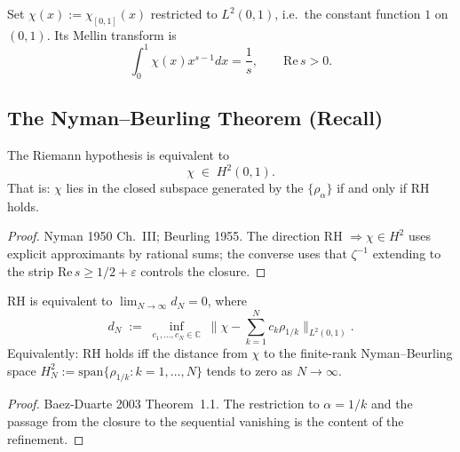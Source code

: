 \begin{definition}
\label{v4-arith:w7-b:def:chi}
Set \(\chi(x):=\chi_{[0,1]}(x)\) restricted to
\(L^{2}(0,1)\), i.e.\ the constant function \(1\) on \((0,1)\). Its Mellin
transform is
\begin{equation}
\label{v4-arith:w7-b:eq:mellin-chi}
\int_{0}^{1}\chi(x)x^{s-1}dx=\frac{1}{s},\qquad\mathrm{Re}\,s>0.
\end{equation}
\end{definition}

\subsection{The Nyman--Beurling Theorem (Recall)}
\label{v4-arith:w7-b:NB-space:theorem}

\begin{theorem}
\label{v4-arith:w7-b:thm:nyman-beurling}
The Riemann hypothesis is equivalent to
\begin{equation}
\label{v4-arith:w7-b:eq:NB-criterion}
\chi\;\in\;H^{2}(0,1).
\end{equation}
That is: \(\chi\) lies in the closed subspace generated by the
\(\{\rho_{\alpha}\}\) if and only if RH holds.
\end{theorem}

\begin{proof}
Nyman 1950 Ch.~III; Beurling 1955. The direction
RH \(\Rightarrow\chi\in H^{2}\) uses explicit approximants by rational
sums; the converse uses that \(\zeta^{-1}\) extending to the strip
\(\mathrm{Re}\,s\geq 1/2+\varepsilon\) controls the closure.
\end{proof}

\begin{theorem}
\label{v4-arith:w7-b:thm:baez-duarte}
RH is equivalent to
\(\lim_{N\to\infty}d_{N}=0\), where
\begin{equation}
\label{v4-arith:w7-b:eq:dN-definition}
d_{N}\;:=\;\inf_{c_{1},\ldots,c_{N}\in\mathbb{C}}\;\bigl\|\chi-\sum_{k=1}^{N}c_{k}\rho_{1/k}\bigr\|_{L^{2}(0,1)}.
\end{equation}
Equivalently: RH holds iff the distance from \(\chi\) to the finite-rank
Nyman--Beurling space
\(H^{2}_{N}:=\mathrm{span}\{\rho_{1/k}:k=1,\ldots,N\}\) tends to zero
as \(N\to\infty\).
\end{theorem}

\begin{proof}
Baez-Duarte 2003 Theorem~1.1. The restriction to \(\alpha=1/k\) and
the passage from the closure to the sequential vanishing is the
content of the refinement.
\end{proof}


